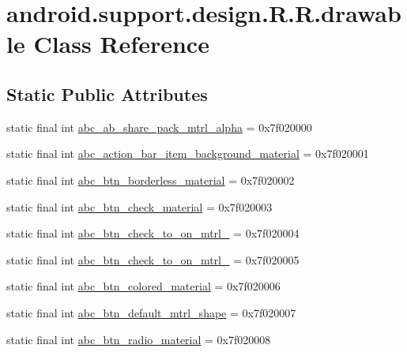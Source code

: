 \hypertarget{classandroid_1_1support_1_1design_1_1_r_1_1drawable}{
\section{android.support.design.R.R.drawable Class Reference}
\label{classandroid_1_1support_1_1design_1_1_r_1_1drawable}
}
\subsection*{Static Public Attributes}
\begin{CompactItemize}
\item 
static final int \hyperlink{classandroid_1_1support_1_1design_1_1_r_1_1drawable_e36c1d2180730cecaafb18af7e13a24d}{abc\_\-ab\_\-share\_\-pack\_\-mtrl\_\-alpha} = 0x7f020000
\item 
static final int \hyperlink{classandroid_1_1support_1_1design_1_1_r_1_1drawable_65728dfd3a9a00197b6315dd1627f46f}{abc\_\-action\_\-bar\_\-item\_\-background\_\-material} = 0x7f020001
\item 
static final int \hyperlink{classandroid_1_1support_1_1design_1_1_r_1_1drawable_e5b942425e72d071840feffd67802a05}{abc\_\-btn\_\-borderless\_\-material} = 0x7f020002
\item 
static final int \hyperlink{classandroid_1_1support_1_1design_1_1_r_1_1drawable_915c12f826979f2d11ff7656a9627db5}{abc\_\-btn\_\-check\_\-material} = 0x7f020003
\item 
static final int \hyperlink{classandroid_1_1support_1_1design_1_1_r_1_1drawable_57652a04b2fb1bea9edae48305390335}{abc\_\-btn\_\-check\_\-to\_\-on\_\-mtrl\_} = 0x7f020004
\item 
static final int \hyperlink{classandroid_1_1support_1_1design_1_1_r_1_1drawable_2bc9ecab48b58cf6a8dbe7b9880d1e6e}{abc\_\-btn\_\-check\_\-to\_\-on\_\-mtrl\_} = 0x7f020005
\item 
static final int \hyperlink{classandroid_1_1support_1_1design_1_1_r_1_1drawable_d980eb8411c54c70c9d99df6a05a08a0}{abc\_\-btn\_\-colored\_\-material} = 0x7f020006
\item 
static final int \hyperlink{classandroid_1_1support_1_1design_1_1_r_1_1drawable_a61db73154a066647dc35da40d394b84}{abc\_\-btn\_\-default\_\-mtrl\_\-shape} = 0x7f020007
\item 
static final int \hyperlink{classandroid_1_1support_1_1design_1_1_r_1_1drawable_4c14a3e3aaa7274f974b268a9c405aa5}{abc\_\-btn\_\-radio\_\-material} = 0x7f020008

\end{CompactItemize}
